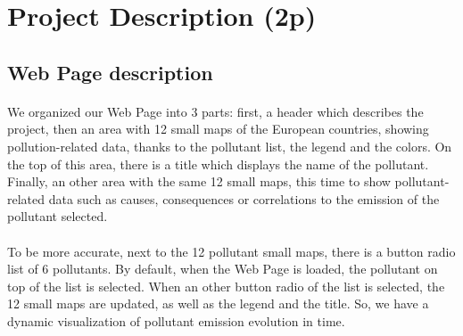 \documentclass[preprint,journal]{vgtc}       %
\begin{document}
\newpage



\section{Project Description (2p)}
\paragraph{}
	\subsection{Web Page description}
	\paragraph{}
We organized our Web Page into 3 parts:  first, a header which describes the project, then an area with 12 small maps of the European countries, showing pollution-related data, thanks to the pollutant list, the legend and the colors. On the top of this area, there is a title which displays the name of the pollutant. Finally, an other area with the same 12 small maps, this time to show pollutant-related data such as causes, consequences or correlations to the emission of the pollutant selected.
\paragraph{}
To be more accurate, next to the 12 pollutant small maps, there is a button radio list of 6 pollutants. By default, when the Web Page is loaded, the pollutant on top of the list is selected. When an other button radio of the list is selected, the 12 small maps are updated, as well as the legend and the title. So, we have a dynamic visualization of pollutant emission evolution in time.
\end{document}
